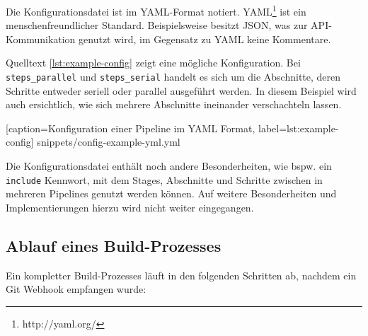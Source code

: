 Die Konfigurationsdatei ist im YAML-Format notiert. YAML\footnote{http://yaml.org/} ist ein menschenfreundlicher Standard. Beispielsweise besitzt JSON, was zur API-Kommunikation genutzt wird, im Gegensatz zu YAML keine Kommentare.

Quelltext \ref{lst:example-config} zeigt eine mögliche Konfiguration. Bei \texttt{steps\_\allowbreak parallel} und \texttt{steps\_\allowbreak serial} handelt es sich um die Abschnitte, deren Schritte entweder seriell oder parallel ausgeführt werden. In diesem Beispiel wird auch ersichtlich, wie sich mehrere Abschnitte ineinander verschachteln lassen.


  [caption={Konfiguration einer Pipeline im YAML Format},
  label={lst:example-config}]
  {snippets/config-example-yml.yml}

Die Konfigurationsdatei enthält noch andere Besonderheiten, wie bspw. ein \texttt{include} Kennwort, mit dem Stages, Abschnitte und Schritte zwischen in mehreren Pipelines genutzt werden können. Auf weitere Besonderheiten und Implementierungen hierzu wird nicht weiter eingegangen.

\subsection{Ablauf eines Build-Prozesses}

Ein kompletter Build-Prozesses läuft in den folgenden Schritten ab, nachdem ein Git Webhook empfangen wurde:

